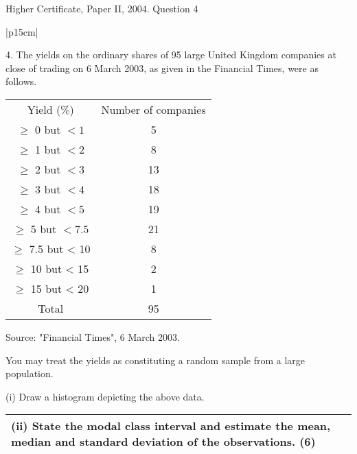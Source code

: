 \documentclass[a4paper,12pt]{article}
\begin{document}
Higher Certificate, Paper II, 2004. Question 4

\begin{table}[ht!]
 
\centering
 
\begin{tabular}{|p{15cm}|}
 
\hline  

4. The yields on the ordinary shares of 95 large United Kingdom companies at close of trading on 6 March 2003, as given in the Financial Times, were as follows. 

\begin{center}
\begin{tabular}{|c|c|} 
Yield (\%)    & Number of companies  \\
$\geq$ 0 but $< 1$  &  5  \\
$\geq$ 1 but $< 2$  &  8  \\
$\geq$ 2 but $< 3$  &  13  \\
$\geq$ 3 but $< 4$ & 18  \\
$\geq$ 4 but $< 5$  & 19   \\  
$\geq$ 5 but $< 7.5$ &  21 \\
$\geq$ 7.5 but < 10  &  8  \\
$\geq$ 10 but < 15  &  2  \\
$\geq$ 15 but < 20  &  1 \\
Total & 95 \\ 
\end{tabular}
\end{center}
           Source:  "Financial Times", 6 March 2003. 
 
You may treat the yields as constituting a random sample from a large population. 
 
(i) Draw a histogram depicting the above data. 
\\ \hline
  
\end{tabular}

\end{table} 



\begin{table}[ht!]
 
\centering
 
\begin{tabular}{|p{15cm}|}
 
(ii) State the modal class interval and estimate the mean, median and standard deviation of the observations. (6) 
 
\\ \hline
  
\end{tabular}

\end{table} 
\end{document}
